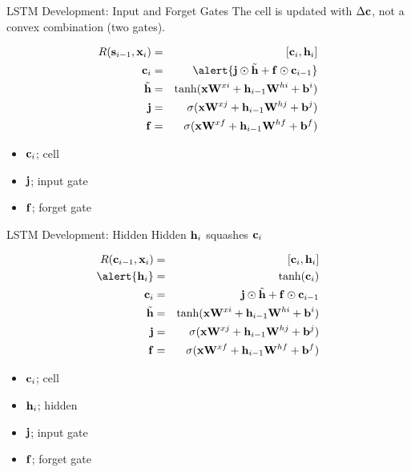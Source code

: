 \documentclass{beamer}
\begin{document}
\begin{frame}{LSTM Development: Input and Forget Gates}
  The cell is updated with $\Delta \mathbf{c}$, not a convex combination (two gates). 

    \begin{eqnarray*}
      R(\bolds_{i-1}, \boldx_i) &=& [\boldc_i, \boldh_i]  \\
      \boldc_i &=& \alert{\boldj \odot \tilde{\boldh}  + \boldf \odot \bold c_{i-1} } \\
      \tilde{\boldh} &=& \tanh(\boldx \boldW^{xi} + \boldh_{i-1}\boldW^{hi} + \boldb^i) \\
      \boldj &=& \sigma(\boldx \boldW^{xj} + \boldh_{i-1}\boldW^{hj} + \boldb^j) \\
      \boldf &=& \sigma(\boldx \boldW^{xf} + \boldh_{i-1}\boldW^{hf} + \boldb^f) 
    \end{eqnarray*}

    \begin{itemize}
    \item $\mathbf{c}_i$; cell
    \item $\mathbf{j}$; input gate
    \item $\mathbf{f}$; forget gate
    \end{itemize}
\end{frame}


\begin{frame}{LSTM Development: Hidden}
  Hidden $\mathbf{h}_i$ squashes $\mathbf{c}_i$

    \begin{eqnarray*}
      R(\boldc_{i-1}, \boldx_i) &=& [\boldc_i, \boldh_i]  \\
      \alert{\boldh_i} &=& \tanh(\boldc_i) \\ 
      \boldc_i &=& \boldj \odot \tilde{\boldh}  + \boldf \odot \bold c_{i-1}  \\
      \tilde{\boldh} &=& \tanh(\boldx \boldW^{xi} + \boldh_{i-1}\boldW^{hi} + \boldb^i) \\
      \boldj &=& \sigma(\boldx \boldW^{xj} + \boldh_{i-1}\boldW^{hj} + \boldb^j) \\
      \boldf &=& \sigma(\boldx \boldW^{xf} + \boldh_{i-1}\boldW^{hf} + \boldb^f) 
    \end{eqnarray*}

    \begin{itemize}
    \item $\mathbf{c}_i$; cell
    \item $\mathbf{h}_i$; hidden
    \item $\mathbf{j}$; input gate
    \item $\mathbf{f}$; forget gate
    \end{itemize}
\end{frame}
\end{document}
